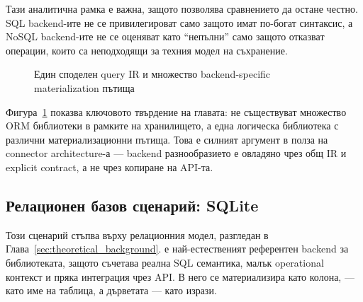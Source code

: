 Тази аналитична рамка е важна, защото позволява сравнението да остане честно. SQL backend-ите не се привилегироват само защото имат по-богат синтаксис, а NoSQL backend-ите не се оценяват като ``непълни'' само защото отказват операции, които са неподходящи за техния модел на съхранение.

\begin{figure}[H]
\centering
{}
\caption{Един споделен query IR и множество backend-specific materialization пътища}
\label{fig:backend_materialisation_paths}
\end{figure}

Фигура~\ref{fig:backend_materialisation_paths} показва ключовото твърдение на главата: не съществуват множество ORM библиотеки в рамките на хранилището, а една логическа библиотека с различни материализационни пътища. Това е силният аргумент в полза на connector architecture-а --- backend разнообразието е овладяно чрез общ IR и explicit contract, а не чрез копиране на API-та.

\subsection{Релационен базов сценарий: SQLite}

Този сценарий стъпва върху релационния модел, разгледан в Глава~\ref{sec:theoretical_background}.  е най-естественият референтен backend за библиотеката, защото съчетава реална SQL семантика, малък operational контекст и пряка интеграция чрез  API. В него  се материализира като колона,  --- като име на таблица, а  дърветата --- като  изрази.


